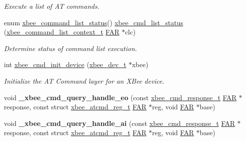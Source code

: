 \begin{DoxyCompactItemize}
\begin{DoxyCompactList}\small\item\em Execute a list of A\-T commands. \end{DoxyCompactList}\item 
enum \hyperlink{group__xbee__atcmd_ga3ec63530d743d1c91126c67493c3245d}{xbee\-\_\-command\-\_\-list\-\_\-status}() \hyperlink{group__xbee__atcmd_gafb2d1636c675066469ee388170ea27a0}{xbee\-\_\-cmd\-\_\-list\-\_\-status} (\hyperlink{structxbee__command__list__context__t}{xbee\-\_\-command\-\_\-list\-\_\-context\-\_\-t} \hyperlink{group__hal_gaef060b3456fdcc093a7210a762d5f2ed}{F\-A\-R} $\ast$clc)
\begin{DoxyCompactList}\small\item\em Determine status of command list execution. \end{DoxyCompactList}\item 
int \hyperlink{group__xbee__atcmd_ga1cc803f821ed44e27e404d38349f53c7}{xbee\-\_\-cmd\-\_\-init\-\_\-device} (\hyperlink{structxbee__dev__t}{xbee\-\_\-dev\-\_\-t} $\ast$xbee)
\begin{DoxyCompactList}\small\item\em Initialize the A\-T Command layer for an X\-Bee device. \end{DoxyCompactList}\item 
\hypertarget{group__xbee__atcmd_gac58af8f94f76f3d3201c055aaa9a559b}{void {\bfseries \-\_\-xbee\-\_\-cmd\-\_\-query\-\_\-handle\-\_\-eo} (const \hyperlink{structxbee__cmd__response__t}{xbee\-\_\-cmd\-\_\-response\-\_\-t} \hyperlink{group__hal_gaef060b3456fdcc093a7210a762d5f2ed}{F\-A\-R} $\ast$response, const struct \hyperlink{structxbee__atcmd__reg__t}{xbee\-\_\-atcmd\-\_\-reg\-\_\-t} \hyperlink{group__hal_gaef060b3456fdcc093a7210a762d5f2ed}{F\-A\-R} $\ast$reg, void \hyperlink{group__hal_gaef060b3456fdcc093a7210a762d5f2ed}{F\-A\-R} $\ast$base)}\label{group__xbee__atcmd_gac58af8f94f76f3d3201c055aaa9a559b}

\item 
\hypertarget{group__xbee__atcmd_ga1a1bd382a9a9f19787577bd709679f82}{void {\bfseries \-\_\-xbee\-\_\-cmd\-\_\-query\-\_\-handle\-\_\-ai} (const \hyperlink{structxbee__cmd__response__t}{xbee\-\_\-cmd\-\_\-response\-\_\-t} \hyperlink{group__hal_gaef060b3456fdcc093a7210a762d5f2ed}{F\-A\-R} $\ast$response, const struct \hyperlink{structxbee__atcmd__reg__t}{xbee\-\_\-atcmd\-\_\-reg\-\_\-t} \hyperlink{group__hal_gaef060b3456fdcc093a7210a762d5f2ed}{F\-A\-R} $\ast$reg, void \hyperlink{group__hal_gaef060b3456fdcc093a7210a762d5f2ed}{F\-A\-R} $\ast$base)}\label{group__xbee__atcmd_ga1a1bd382a9a9f19787577bd709679f82}


\end{DoxyCompactItemize}
